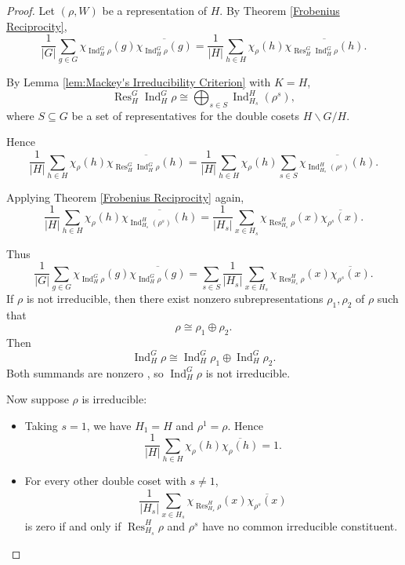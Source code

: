 \begin{proof}
Let \((\rho, W)\) be a representation of \(H\). By Theorem \ref{Frobenius Reciprocity},
\[
\frac{1}{|G|} \sum_{g \in G} \chi_{\operatorname{Ind}_H^G \rho}(g) \overline{\chi_{\operatorname{Ind}_H^G \rho}(g)}
=
\frac{1}{|H|} \sum_{h \in H} \chi_{\rho}(h) \overline{ \chi_{\operatorname{Res}_H^G \operatorname{Ind}_H^G \rho}(h) }.
\]

By Lemma \ref{lem:Mackey's Irreducibility Criterion} with \(K = H\), 
\[
\operatorname{Res}_H^G \operatorname{Ind}_H^G \rho
\cong
\bigoplus_{s \in S}
\operatorname{Ind}_{H_s}^H (\rho^s),
\]
where \(S \subseteq G\) be a set of representatives for the  double cosets \(H\backslash G/H\).

Hence
\[
\frac{1}{|H|} \sum_{h \in H} \chi_{\rho}(h) \overline{ \chi_{\operatorname{Res}_H^G \operatorname{Ind}_H^G \rho}(h) }
=
\frac{1}{|H|} \sum_{h \in H}
\chi_{\rho}(h) \sum_{s \in S}\overline{ \chi_{\operatorname{Ind}_{H_s}^H (\rho^s)}(h) }.
\]

Applying Theorem \ref{Frobenius Reciprocity} again,
\[
\frac{1}{|H|} \sum_{h \in H}
\chi_{\rho}(h) \overline{ \chi_{\operatorname{Ind}_{H_s}^H (\rho^s)}(h) }
=
\frac{1}{|H_s|} \sum_{x \in H_s}
\chi_{\operatorname{Res}_{H_s}^H \rho}(x) \overline{ \chi_{\rho^s}(x) }.
\]

Thus
\[
\frac{1}{|G|} \sum_{g \in G} \chi_{\operatorname{Ind}_H^G \rho}(g) \overline{\chi_{\operatorname{Ind}_H^G \rho}(g)}
=
\sum_{s \in S}
\frac{1}{|H_s|} \sum_{x \in H_s}
\chi_{\operatorname{Res}_{H_s}^H \rho}(x) \overline{ \chi_{\rho^s}(x) }.
\]
If \(\rho\) is not irreducible, then there exist nonzero subrepresentations \(\rho_1, \rho_2\) of \(\rho\) such that
\[
\rho \cong \rho_1 \oplus \rho_2.
\]
Then
\[
\operatorname{Ind}_H^G \rho \cong \operatorname{Ind}_H^G \rho_1 \oplus \operatorname{Ind}_H^G \rho_2.
\]
Both summands are nonzero , so \(\operatorname{Ind}_H^G \rho\) is not irreducible.


Now suppose \(\rho\) is irreducible:
\begin{itemize}
    \item Taking \(s = 1\), we have \(H_1 = H\) and \(\rho^1 = \rho\). Hence \[
    \frac{1}{|H|} \sum_{h \in H} \chi_{\rho}(h) \overline{\chi_{\rho}(h)}=1.
    \]
  
    \item For every other double coset with \(s \neq 1\), 
    \[
    \frac{1}{|H_s|} \sum_{x \in H_s}
    \chi_{\operatorname{Res}_{H_s}^H \rho}(x) \overline{ \chi_{\rho^s}(x) }
    \]
    is zero if and only if \(\operatorname{Res}_{H_s}^H \rho\) and \(\rho^s\) have no common irreducible constituent.
\end{itemize}

\end{proof}